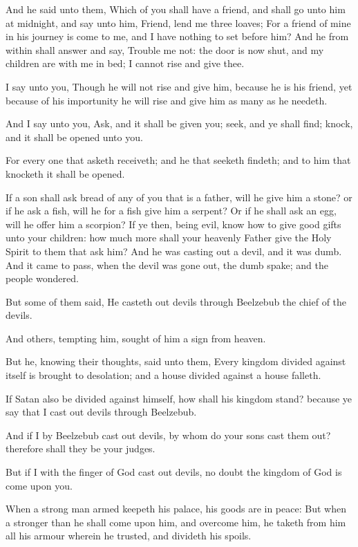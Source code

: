 \Verse And he said unto them, Which of you shall have a friend, and shall go unto him at midnight, and say unto him, Friend, lend me three loaves; \Verse For a friend of mine in his journey is come to me, and I have nothing to set before him?  \Verse And he from within shall answer and say, Trouble me not: the door is now shut, and my children are with me in bed; I cannot rise and give thee.

\Verse I say unto you, Though he will not rise and give him, because he is his friend, yet because of his importunity he will rise and give him as many as he needeth.

\Verse And I say unto you, Ask, and it shall be given you; seek, and ye shall find; knock, and it shall be opened unto you.

\Verse For every one that asketh receiveth; and he that seeketh findeth; and to him that knocketh it shall be opened.

\Verse If a son shall ask bread of any of you that is a father, will he give him a stone? or if he ask a fish, will he for a fish give him a serpent?  \Verse Or if he shall ask an egg, will he offer him a scorpion?  \Verse If ye then, being evil, know how to give good gifts unto your children: how much more shall your heavenly Father give the Holy Spirit to them that ask him?  \Verse And he was casting out a devil, and it was dumb. And it came to pass, when the devil was gone out, the dumb spake; and the people wondered.

\Verse But some of them said, He casteth out devils through Beelzebub the chief of the devils.

\Verse And others, tempting him, sought of him a sign from heaven.

\Verse But he, knowing their thoughts, said unto them, Every kingdom divided against itself is brought to desolation; and a house divided against a house falleth.

\Verse If Satan also be divided against himself, how shall his kingdom stand? because ye say that I cast out devils through Beelzebub.

\Verse And if I by Beelzebub cast out devils, by whom do your sons cast them out? therefore shall they be your judges.

\Verse But if I with the finger of God cast out devils, no doubt the kingdom of God is come upon you.

\Verse When a strong man armed keepeth his palace, his goods are in peace: \Verse But when a stronger than he shall come upon him, and overcome him, he taketh from him all his armour wherein he trusted, and divideth his spoils.

